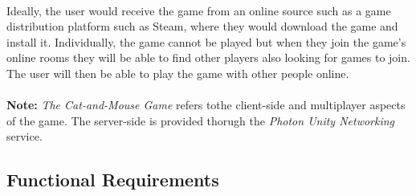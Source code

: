\documentclass[12pt, titlepage]{article}
\begin{document}
\paragraph{}Ideally, the user would receive the game from an online source such as a game distribution platform such as Steam, where they would download the game and install it. Individually, the game cannot be played but when they join the game's online rooms they will be able to find other players also looking for games to join. The user will then be able to play the game with other people online. 

\paragraph{}\textbf{Note:} \emph{The Cat-and-Mouse Game} refers tothe client-side and multiplayer aspects of the game. The server-side is provided thorugh the \emph{Photon Unity Networking} service. 
\subsection{Functional Requirements}
\end{document}
